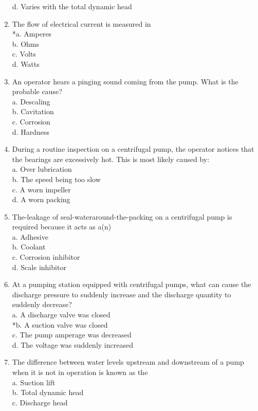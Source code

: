 \begin{enumerate}[1.]
d. Varies with the total dynamic head\\
\item The flow of electrical current is measured in\\
*a. Amperes\\
b. Ohms\\
c. Volts\\
d. Watts\\
\item An operator hears a pinging sound coming from the pump. What is the probable cause?\\
a. Descaling\\
b. Cavitation\\
c. Corrosion\\
d. Hardness\\
\item During a routine inspection on a centrifugal pump, the operator notices that the bearings are excessively hot. This is most likely caused by:\\
a. Over lubrication\\
b. The speed being too slow\\
c. A worn impeller\\
d. A worn packing\\
\item The-leakage of seal-wateraround-the-packing on a centrifugal pump is required because it acts as a(n)\\
a. Adhesive\\
b. Coolant\\
c. Corrosion inhibitor\\
d. Scale inhibitor\\
\item At a pumping station equipped with centrifugal pumps, what can cause the discharge pressure to suddenly increase and the discharge quantity to suddenly decrease?\\
a. A discharge valve was closed\\
*b. A suction valve was closed\\
c. The pump amperage was decreased\\
d. The voltage was suddenly increased\\
\item The difference between water levels upstream and downstream of a pump when it is not in operation is known as the\\
a. Suction lift\\
b. Total dynamic head\\
c. Discharge head\\

\end{enumerate}
